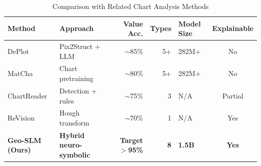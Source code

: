 \begin{table}[htbp]
\centering
\caption{Comparison with Related Chart Analysis Methods}
\label{tab:comparison-related}
\begin{tabular}{@{}lp{2.5cm}rrlc@{}}
\toprule
\textbf{Method} & \textbf{Approach} & \textbf{Value Acc.} & \textbf{Types} & \textbf{Model Size} & \textbf{Explainable} \\
\midrule
DePlot \cite{liu2023deplot}     & Pix2Struct + LLM       & $\sim$85\% & 5+ & 282M+ & No \\
MatCha \cite{lee2023matcha}     & Chart pretraining      & $\sim$80\% & 5+ & 282M+ & No \\
ChartReader \cite{chen2022chartreader} & Detection + rules & $\sim$75\% & 3  & N/A   & Partial \\
ReVision \cite{savva2011revision}      & Hough transform   & $\sim$70\% & 1  & N/A   & Yes \\
\midrule
\textbf{Geo-SLM (Ours)} & \textbf{Hybrid neuro-symbolic} & \textbf{Target $>$95\%} & \textbf{8} & \textbf{1.5B} & \textbf{Yes} \\
\bottomrule
\end{tabular}
\end{table}